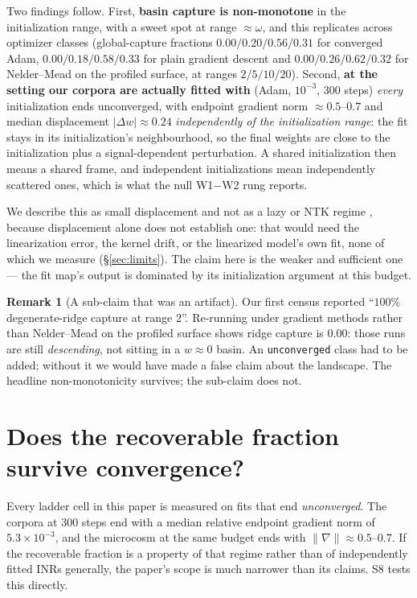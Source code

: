 \documentclass[10pt,twocolumn,letterpaper]{article}
\theoremstyle{definition}
\newtheorem{remark}[theorem]{Remark}
\begin{document}
Two findings follow. First, \textbf{basin capture is non-monotone} in the initialization range,
with a sweet spot at range $\approx \omega$, and this replicates across optimizer classes
(global-capture fractions $0.00/0.20/0.56/0.31$ for converged Adam, $0.00/0.18/0.58/0.33$ for
plain gradient descent and $0.00/0.26/0.62/0.32$ for Nelder--Mead on the profiled surface, at
ranges $2/5/10/20$). Second, \textbf{at the setting our corpora are actually fitted with}
(Adam, $10^{-3}$, $300$ steps) \emph{every} initialization ends unconverged, with endpoint
gradient norm $\approx 0.5$--$0.7$ and median displacement $|\Delta w| \approx 0.24$
\emph{independently of the initialization range}: the fit stays in its initialization's
neighbourhood, so the final weights are close to the initialization plus a signal-dependent
perturbation. A shared initialization then means a shared frame, and independent initializations
mean independently scattered ones, which is what the null W1$-$W2 rung reports.

We describe this as small displacement and not as a lazy or NTK regime
\citep{jacot2018ntk,chizat2019lazy}, because displacement alone does not establish one: that would
need the linearization error, the kernel drift, or the linearized model's own fit, none of which we
measure (\S\ref{sec:limits}). The claim here is the weaker and sufficient one --- the fit map's
output is dominated by its initialization argument at this budget.

\begin{remark}[A sub-claim that was an artifact]
Our first census reported ``$100\%$ degenerate-ridge capture at range $2$''. Re-running under
gradient methods rather than Nelder--Mead on the profiled surface shows ridge capture is $0.00$:
those runs are still \emph{descending}, not sitting in a $w\approx0$ basin. An
\texttt{unconverged} class had to be added; without it we would have made a false claim about the
landscape. The headline non-monotonicity survives; the sub-claim does not.
\end{remark}

\section{Does the recoverable fraction survive convergence?}\label{sec:convergence}

Every ladder cell in this paper is measured on fits that end \emph{unconverged}. The corpora at
$300$ steps end with a median relative endpoint gradient norm of $5.3\times10^{-3}$, and the
microcosm at the same budget ends with $\|\nabla\|\approx0.5$--$0.7$. If the recoverable fraction is
a property of that regime rather than of independently fitted INRs generally, the paper's scope is
much narrower than its claims. S8 tests this directly.
\end{document}
